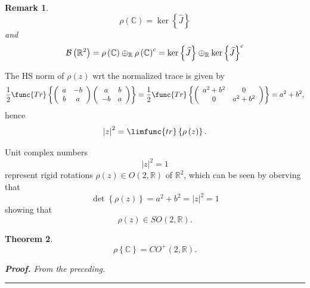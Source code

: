 \documentclass[aps,preprint]{revtex4}
\newtheorem{theorem}{Theorem}
\newtheorem{remark}[theorem]{Remark}
\newenvironment{proof}[1][Proof]{\noindent\textbf{#1.} }{\ \rule{0.5em}{0.5em}}
\begin{document}
\begin{remark}
\begin{equation}
\rho \left( \mathbb{C}\right) =\ker \left\{ \widehat{J}\right\}
\end{equation}%
and 
\begin{equation}
\mathcal{B}\left( \mathbb{R}^{2}\right) =\rho \left( \mathbb{C}\right)
\oplus _{\mathbb{R}}\rho \left( \mathbb{C}\right) ^{c}=\ker \left\{ \widehat{%
J}\right\} \oplus _{\mathbb{R}}\ker \left\{ \widehat{J}\right\} ^{c}
\end{equation}
\end{remark}

The HS norm of $\rho \left( z\right) $ wrt the normalized trace is given by 
\begin{equation}
\frac{1}{2}\func{Tr}\left\{ \left( 
\begin{array}{cc}
a & -b \\ 
b & a%
\end{array}%
\right) \left( 
\begin{array}{cc}
a & b \\ 
-b & a%
\end{array}%
\right) \right\} =\frac{1}{2}\func{Tr}\left\{ \left( 
\begin{array}{cc}
a^{2}+b^{2} & 0 \\ 
0 & a^{2}+b^{2}%
\end{array}%
\right) \right\} =a^{2}+b^{2},
\end{equation}%
hence 
\begin{equation}
\left\vert z\right\vert ^{2}=\limfunc{tr}\left\{ \rho \left( z\right)
\right\} .
\end{equation}

Unit complex numbers 
\begin{equation}
\left\vert z\right\vert ^{2}=1
\end{equation}%
represent rigid rotations $\rho \left( z\right) \in O\left( 2,\mathbb{R}%
\right) $ of $\mathbb{R}^{2}$, which can be seen by oberving that 
\begin{equation}
\det \left\{ \rho \left( z\right) \right\} =a^{2}+b^{2}=\left\vert
z\right\vert ^{2}=1
\end{equation}%
showing that 
\begin{equation}
\rho \left( z\right) \in SO\left( 2,\mathbb{R}\right) .
\end{equation}

\begin{theorem}
\begin{equation}
\rho \left\{ \mathbb{C}\right\} =CO^{+}\left( 2,\mathbb{R}\right) .
\end{equation}

\begin{proof}
From the preceding.
\end{proof}
\end{theorem}
\end{document}
